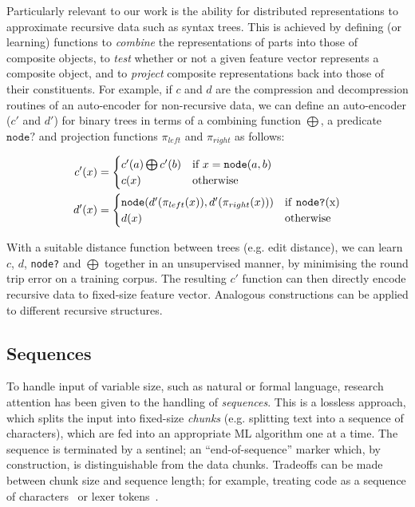 Particularly relevant to our work is the ability for distributed representations
to approximate recursive data such as syntax trees. This is achieved by defining
(or learning) functions to \emph{combine} the representations of parts into
those of composite objects, to \emph{test} whether or not a given feature vector
represents a composite object, and to \emph{project} composite representations
back into those of their constituents. For example, if $c$ and $d$ are the
compression and decompression routines of an auto-encoder for non-recursive
data, we can define an auto-encoder ($c'$ and $d'$) for binary trees in terms
of a combining function $\bigoplus$, a predicate $\texttt{node?}$ and projection
functions $\pi_{left}$ and $\pi_{right}$ as follows:

\begin{align*}
  c'(x) &= \begin{cases}
             c'(a) \bigoplus c'(b) & \text{if $x = \texttt{node}(a, b)$} \\
             c(x)                  & \text{otherwise}
           \end{cases} \\
  d'(x) &= \begin{cases}
             \texttt{node}(d'(\pi_{left }(x)),
                           d'(\pi_{right}(x))) & \text{if \texttt{node?}(x)} \\
             d(x)                              & \text{otherwise}
           \end{cases}
\end{align*}

With a suitable distance function between trees (e.g. edit distance), we can
learn $c$, $d$, \texttt{node?} and $\bigoplus$ together in an unsupervised
manner, by minimising the round trip error on a training corpus. The resulting
$c'$ function can then directly encode recursive data to fixed-size feature
vector. Analogous constructions can be applied to different recursive
structures.

\subsection{Sequences}

To handle input of variable size, such as natural or formal language, research
attention has been given to the handling of \emph{sequences}. This is a lossless
approach, which splits the input into fixed-size \emph{chunks} (e.g. splitting
text into a sequence of characters), which are fed into an appropriate ML
algorithm one at a time. The sequence is terminated by a sentinel; an
``end-of-sequence'' marker which, by construction, is distinguishable from the
data chunks. Tradeoffs can be made between chunk size and sequence length; for
example, treating code as a sequence of
characters~\cite{cummins2017synthesizing} or lexer tokens~\cite{cummins2017end}.


